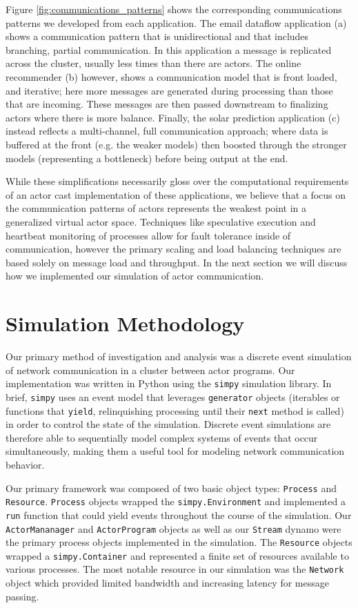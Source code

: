 \documentclass[conference,twocolumn,10pt]{IEEEtran}
\begin{document}
Figure \ref{fig:communications_patterns} shows the corresponding communications patterns we developed from each application. The email dataflow application (a) shows a communication pattern that is unidirectional and that includes branching, partial communication. In this application a message is replicated across the cluster, usually less times than there are actors. The online recommender (b) however, shows a communication model that is front loaded, and iterative; here more messages are generated during processing than those that are incoming. These messages are then passed downstream to finalizing actors where there is more balance. Finally, the solar prediction application (c) instead reflects a multi-channel, full communication approach; where data is buffered at the front (e.g. the weaker models) then boosted through the stronger models (representing a bottleneck) before being output at the end.

While these simplifications necessarily gloss over the computational requirements of an actor cast implementation of these applications, we believe that a focus on the communication patterns of actors represents the weakest point in a generalized virtual actor space. Techniques like speculative execution and heartbeat monitoring of processes allow for fault tolerance inside of communication, however the primary scaling and load balancing techniques are based solely on message load and throughput. In the next section we will discuss how we implemented our simulation of actor communication.

\section{Simulation Methodology}

Our primary method of investigation and analysis was a discrete event simulation of network communication in a cluster between actor programs. Our implementation was written in Python using the \texttt{simpy} \cite{matloff_introduction_2008} simulation library. In brief, \texttt{simpy} uses an event model that leverages \texttt{generator} objects (iterables or functions that \texttt{yield}, relinquishing processing until their \texttt{next} method is called) in order to control the state of the simulation. Discrete event simulations are therefore able to sequentially model complex systems of events that occur simultaneously, making them a useful tool for modeling network communication behavior.

Our primary framework was composed of two basic object types: \texttt{Process} and \texttt{Resource}. \texttt{Process} objects wrapped the \texttt{simpy.Environment} and implemented a \texttt{run} function that could yield events throughout the course of the simulation. Our \texttt{ActorMananager} and \texttt{ActorProgram} objects as well as our \texttt{Stream} dynamo were the primary process objects implemented in the simulation. The \texttt{Resource} objects wrapped a \texttt{simpy.Container} and represented a finite set of resources available to various processes. The most notable resource in our simulation was the \texttt{Network} object which provided limited bandwidth and increasing latency for message passing.
\end{document}
